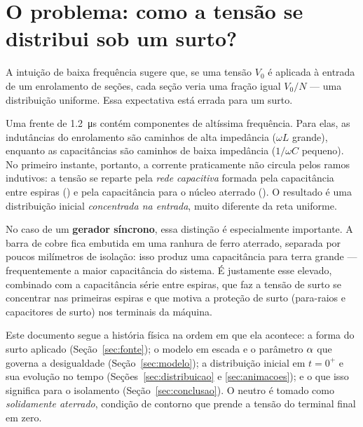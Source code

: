 \section{O problema: como a tensão se distribui sob um surto?}

A intuição de baixa frequência sugere que, se uma tensão \(V_0\) é aplicada à entrada de um enrolamento
de \Nsec{} seções, cada seção veria uma fração igual \(V_0/N\) — uma distribuição uniforme. Essa
expectativa está errada para um surto.

Uma frente de \SI{1.2}{\micro\second} contém componentes de altíssima frequência. Para elas, as
indutâncias do enrolamento são caminhos de alta impedância (\(\omega L\) grande), enquanto as
capacitâncias são caminhos de baixa impedância (\(1/\omega C\) pequeno). No primeiro instante, portanto,
a corrente praticamente não circula pelos ramos indutivos: a tensão se reparte pela \emph{rede
capacitiva} formada pela capacitância entre espiras (\Cs) e pela capacitância para o núcleo aterrado
(\Cg). O resultado é uma distribuição inicial \emph{concentrada na entrada}, muito diferente da reta
uniforme.

No caso de um \textbf{gerador síncrono}, essa distinção é especialmente importante. A barra de cobre
fica embutida em uma ranhura de ferro aterrado, separada por poucos milímetros de isolação: isso produz
uma capacitância para terra \Cg{} grande — frequentemente a maior capacitância do sistema. É justamente
esse \Cg{} elevado, combinado com a capacitância série \Cs{} entre espiras, que faz a tensão de surto se
concentrar nas primeiras espiras e que motiva a proteção de surto (para-raios e capacitores de surto)
nos terminais da máquina.

Este documento segue a história física na ordem em que ela acontece: a forma do surto aplicado
(Seção~\ref{sec:fonte}); o modelo em escada e o parâmetro \(\alpha\) que governa a desigualdade
(Seção~\ref{sec:modelo}); a distribuição inicial em \(t=0^+\) e sua evolução no tempo
(Seções~\ref{sec:distribuicao} e \ref{sec:animacoes}); e o que isso significa para o isolamento
(Seção~\ref{sec:conclusao}). O neutro é tomado como \emph{solidamente aterrado}, condição de contorno
que prende a tensão do terminal final em zero.
